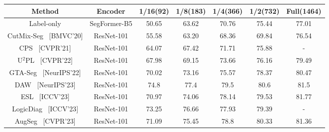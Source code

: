 
\begin{table}[]
\renewcommand{\arraystretch}{1.2}
\vspace{-0.5cm}
\centering
\begin{tabular}{c|c|ccccc}
\hline
\rowcolor[HTML]{DAE8FC}
Method                                     & Encoder & 1/16(92)                     & 1/8(183)                     & 1/4(366)                     & 1/2(732)                     & Full(1464)                   \\ \hline
Label-only                     & SegFormer-B5     & 50.65                        & 63.62                        & 70.76                        & 75.44                        & 77.01                        \\ \hline
CutMix-Seg \cite{French2019SemisupervisedSS}\ \textcolor[HTML]{9B9B9B}{\scriptsize[{BMVC'20}]} & ResNet-101     & 55.58               & 63.20                 & 68.36               & 69.84          & 76.54       \\
CPS \cite{chen2021semi}\ \textcolor[HTML]{9B9B9B}{\scriptsize[{CVPR'21}]} &ResNet-101     & 64.07              & 67.42                 & 71.71                                      & 75.88            & -            \\
U$^2$PL \cite{wang2022semi}\ \textcolor[HTML]{9B9B9B}{\scriptsize[{CVPR'22}]} &ResNet-101     & 67.98                   & 69.15            & 73.66           & 76.16                     & 79.49                  \\
GTA-Seg \cite{jin2022semi}\ \textcolor[HTML]{9B9B9B}{\scriptsize[{NeurIPS'22}]} &ResNet-101     & 70.02              & 73.16               & 75.57              & 78.37                  & 80.47                     \\
DAW \cite{sun2024daw}\ \textcolor[HTML]{9B9B9B}{\scriptsize[{NeurIPS'23}]} &ResNet-101     & 74.8            & 77.4                  & 79.5                 & 80.6                   & 81.5                        \\
ESL \cite{ma2023enhanced}\ \textcolor[HTML]{9B9B9B}{\scriptsize[{ICCV'23}]} &ResNet-101    & 70.97                     & 74.06                    & 78.14                 & 79.53                   & 81.77          \\
LogicDiag \cite{liang2023logic}\ \textcolor[HTML]{9B9B9B}{\scriptsize[{ICCV'23}]} &ResNet-101     & 73.25               & 76.66            & 77.93              & 79.39                   & -                 \\
AugSeg \cite{zhao2023augmentation}\ \textcolor[HTML]{9B9B9B}{\scriptsize[{CVPR'23}]} &ResNet-101     & 71.09                 & 75.45              & 78.8                & 80.33         & 81.36                \\

\end{tabular}
\end{table}
